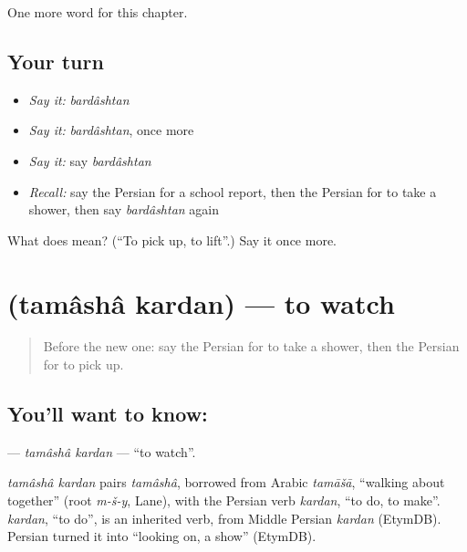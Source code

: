 \begin{grammarlens}[title={What you've built}]
One more word for this chapter.
\end{grammarlens}

\subsection*{Your turn}
\begin{itemize}
\raggedright
  \item \emph{Say it:} \emph{bardâshtan}
  \item \emph{Say it:} \emph{bardâshtan}, once more
  \item \emph{Say it:} say \emph{bardâshtan}
  \item \emph{Recall:} say the Persian for a school report, then the Persian for to take a shower, then say \emph{bardâshtan} again
\end{itemize}

\begin{tcolorbox}[breakable,colback=teal!4,colframe=teal!35!black,title={Before you move on}]
What does  mean? (\textquotedblleft{}To pick up, to lift\textquotedblright{}.) Say it once more.
\end{tcolorbox}
\section[\texorpdfstring{\fa{تماشا} \fa{کردن} (tamâshâ kardan)}{تماشا کردن (tamâshâ kardan)}]{  (tamâshâ kardan) — to watch}

\label{lesson:FA-C179-tamasha-kardan}



\begin{quote}
Before the new one: say the Persian for to take a shower, then the Persian for to pick up.
\end{quote}

\subsection*{You'll want to know:  }
\textbf{ } — \emph{tamâshâ kardan} — \textquotedblleft{}to watch\textquotedblright{}.

\begin{cousinweb}
\emph{tamâshâ kardan} pairs \emph{tamâshâ}, borrowed from Arabic \emph{tamāšā}, \textquotedblleft{}walking about together\textquotedblright{} (root \emph{m-š-y}, Lane), with the Persian verb \emph{kardan}, \textquotedblleft{}to do, to make\textquotedblright{}. \emph{kardan}, \textquotedblleft{}to do\textquotedblright{}, is an inherited verb, from Middle Persian \emph{kardan} (EtymDB). Persian turned it into \textquotedblleft{}looking on, a show\textquotedblright{} (EtymDB).
\end{cousinweb}

